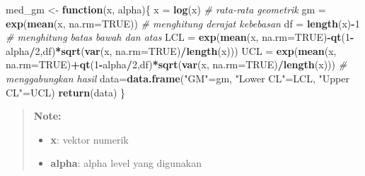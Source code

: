 \documentclass[]{book}
\newenvironment{Shaded}{\begin{snugshade}}{\end{snugshade}}
\newcommand{\KeywordTok}[1]{\textcolor[rgb]{0.13,0.29,0.53}{\textbf{#1}}}
\newcommand{\DataTypeTok}[1]{\textcolor[rgb]{0.13,0.29,0.53}{#1}}
\newcommand{\DecValTok}[1]{\textcolor[rgb]{0.00,0.00,0.81}{#1}}
\newcommand{\FloatTok}[1]{\textcolor[rgb]{0.00,0.00,0.81}{#1}}
\newcommand{\StringTok}[1]{\textcolor[rgb]{0.31,0.60,0.02}{#1}}
\newcommand{\CommentTok}[1]{\textcolor[rgb]{0.56,0.35,0.01}{\textit{#1}}}
\newcommand{\OtherTok}[1]{\textcolor[rgb]{0.56,0.35,0.01}{#1}}
\newcommand{\ControlFlowTok}[1]{\textcolor[rgb]{0.13,0.29,0.53}{\textbf{#1}}}
\newcommand{\OperatorTok}[1]{\textcolor[rgb]{0.81,0.36,0.00}{\textbf{#1}}}
\newcommand{\NormalTok}[1]{#1}
\providecommand{\tightlist}{%
  \setlength{\itemsep}{0pt}\setlength{\parskip}{0pt}}
\begin{document}
\begin{Shaded}
\begin{Highlighting}[]
\NormalTok{med_gm <-}\StringTok{ }\ControlFlowTok{function}\NormalTok{(x, alpha)\{}
\NormalTok{  x =}\StringTok{ }\KeywordTok{log}\NormalTok{(x)}
  \CommentTok{# rata-rata geometrik}
\NormalTok{  gm =}\StringTok{ }\KeywordTok{exp}\NormalTok{(}\KeywordTok{mean}\NormalTok{(x, }\DataTypeTok{na.rm=}\OtherTok{TRUE}\NormalTok{))}
  \CommentTok{# menghitung derajat kebebasan}
\NormalTok{  df =}\StringTok{ }\KeywordTok{length}\NormalTok{(x)}\OperatorTok{-}\DecValTok{1}
  \CommentTok{# menghitung batas bawah dan atas}
\NormalTok{  LCL =}\StringTok{ }\KeywordTok{exp}\NormalTok{(}\KeywordTok{mean}\NormalTok{(x, }\DataTypeTok{na.rm=}\OtherTok{TRUE}\NormalTok{)}\OperatorTok{-}\KeywordTok{qt}\NormalTok{(}\DecValTok{1}\OperatorTok{-}\NormalTok{alpha}\OperatorTok{/}\DecValTok{2}\NormalTok{,df)}\OperatorTok{*}\KeywordTok{sqrt}\NormalTok{(}\KeywordTok{var}\NormalTok{(x, }\DataTypeTok{na.rm=}\OtherTok{TRUE}\NormalTok{)}\OperatorTok{/}\KeywordTok{length}\NormalTok{(x)))}
\NormalTok{  UCL =}\StringTok{ }\KeywordTok{exp}\NormalTok{(}\KeywordTok{mean}\NormalTok{(x, }\DataTypeTok{na.rm=}\OtherTok{TRUE}\NormalTok{)}\OperatorTok{+}\KeywordTok{qt}\NormalTok{(}\DecValTok{1}\OperatorTok{-}\NormalTok{alpha}\OperatorTok{/}\DecValTok{2}\NormalTok{,df)}\OperatorTok{*}\KeywordTok{sqrt}\NormalTok{(}\KeywordTok{var}\NormalTok{(x, }\DataTypeTok{na.rm=}\OtherTok{TRUE}\NormalTok{)}\OperatorTok{/}\KeywordTok{length}\NormalTok{(x)))}
  \CommentTok{# menggabungkan hasil}
\NormalTok{  data=}\KeywordTok{data.frame}\NormalTok{(}\StringTok{"GM"}\NormalTok{=gm,}
                  \StringTok{"Lower CL"}\NormalTok{=LCL,}
                  \StringTok{"Upper CL"}\NormalTok{=UCL)}
  \KeywordTok{return}\NormalTok{(data)}
\NormalTok{\}}
\end{Highlighting}
\end{Shaded}

\begin{quote}
\textbf{Note: }

\begin{itemize}
\tightlist
\item
  \textbf{x}: vektor numerik
\item
  \textbf{alpha}: alpha level yang digunakan
\end{itemize}
\end{quote}

\begin{Shaded}
\end{Shaded}
\end{document}
